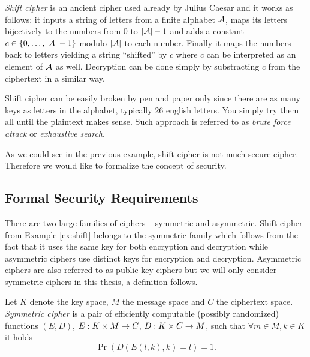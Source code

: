 \begin{example}
\label{ex:shift}
	{\em Shift cipher} is an ancient cipher used already by Julius Caesar and it works as follows: it inputs a string of letters from a finite alphabet $\cal A$, maps its letters bijectively to the numbers from $0$ to $|{\cal A}|-1$ and adds a constant $c\in\{0 , \ldots , |{\cal A}|-1\}$ modulo $|\cal A|$ to each number. Finally it maps the numbers back to letters yielding a string ``shifted'' by $c$ where $c$ can be interpreted as an element of $\cal A$ as well. Decryption can be done simply by substracting $c$ from the ciphertext in a similar way.
	
	Shift cipher can be easily broken by pen and paper only since there are as many keys as letters in the alphabet, typically $26$ english letters. You simply try them all until the plaintext makes sense. Such approach is referred to as {\em brute force attack} or {\em exhaustive search}.
\end{example}

As we could see in the previous example, shift cipher is not much secure cipher. Therefore we would like to formalize the concept of security.


\subsection{Formal Security Requirements}

There are two large families of ciphers -- symmetric and asymmetric. Shift cipher from Example \ref{ex:shift} belongs to the symmetric family which follows from the fact that it uses the same key for both encryption and decryption while asymmetric ciphers use distinct keys for encryption and decryption. Asymmetric ciphers are also referred to as public key ciphers but we will only consider symmetric ciphers in this thesis, a definition follows.

\begin{defn}
	Let $K$ denote the key space, $M$ the message space and $C$ the ciphertext space. {\em Symmetric cipher} is a pair of efficiently computable (possibly randomized) functions $(E,D)$, $E:K\times M\rightarrow C$, $D:K\times C\rightarrow M$, such that $\forall m\in M, k\in K$ it holds
	\begin{equation}
		\Pr\left(D(E(l,k),k)=l\right) = 1 . \label{eq:correct}
	\end{equation}
\end{defn}

